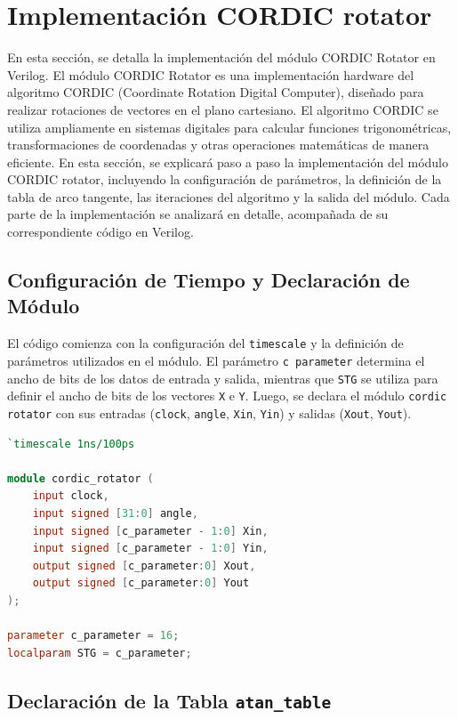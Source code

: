 \documentclass[12pt,a4paper, twoside]{article} %
\begin{document}
\section{Implementación CORDIC rotator}
\label{sec:orgc1c4017}

En esta sección, se detalla la implementación del módulo CORDIC Rotator en Verilog. El módulo CORDIC Rotator es una implementación hardware del algoritmo CORDIC (Coordinate Rotation Digital Computer), diseñado para realizar rotaciones de vectores en el plano cartesiano. El algoritmo CORDIC se utiliza ampliamente en sistemas digitales para calcular funciones trigonométricas, transformaciones de coordenadas y otras operaciones matemáticas de manera eficiente. En esta sección, se explicará paso a paso la implementación del módulo CORDIC rotator, incluyendo la configuración de parámetros, la definición de la tabla de arco tangente, las iteraciones del algoritmo y la salida del módulo. Cada parte de la implementación se analizará en detalle, acompañada de su correspondiente código en Verilog.

\subsection{Configuración de Tiempo y Declaración de Módulo}

El código comienza con la configuración del \texttt{timescale} y la definición de parámetros utilizados en el módulo. El parámetro \texttt{c parameter} determina el ancho de bits de los datos de entrada y salida, mientras que \texttt{STG} se utiliza para definir el ancho de bits de los vectores \texttt{X} e \texttt{Y}. Luego, se declara el módulo \texttt{cordic rotator} con sus entradas (\texttt{clock}, \texttt{angle}, \texttt{Xin}, \texttt{Yin}) y salidas (\texttt{Xout}, \texttt{Yout}).

\begin{lstlisting}[language=Verilog]
`timescale 1ns/100ps

module cordic_rotator (
    input clock,
    input signed [31:0] angle,
    input signed [c_parameter - 1:0] Xin,
    input signed [c_parameter - 1:0] Yin,
    output signed [c_parameter:0] Xout,
    output signed [c_parameter:0] Yout
);

parameter c_parameter = 16;
localparam STG = c_parameter;
\end{lstlisting}

\subsection{Declaración de la Tabla \texttt{atan\_table}}
\end{document}
